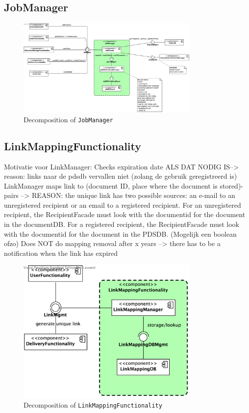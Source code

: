\documentclass[a4paper,10pt]{article}
\begin{document}
\subsection{JobManager}\label{subsec:decomp-JobManager}
\begin{figure}[!htp]
	\centering
	\includegraphics[width=0.8\textwidth]{JobManager.png}
	\caption{Decomposition of \texttt{JobManager}}
	\label{fig:decomp-JobManager}
\end{figure}
\FloatBarrier

\subsection{LinkMappingFunctionality}\label{subsec:decomp-LinkMappingFunctionality}
Motivatie voor LinkManager: Checks expiration date ALS DAT NODIG IS--> reason: links naar de pdsdb vervallen niet (zolang de gebruik geregistreerd is)
LinkManager maps link to (document ID, place where the document is stored)-pairs --> REASON: the unique link has two possible sources: an e-mail to an unregistered recipient or an email to a registered recipient. For an unregistered recipient, the RecipientFacade must look with the documentid for the document in the documentDB. For a registered recipient, the RecipientFacade must look with the documentid for the document  in the PDSDB. (Mogelijk een boolean ofzo)
Does NOT do mapping removal after x years --> there has to be a notification when the link has expired
\begin{figure}[!htp]
	\centering
	\includegraphics[width=0.8\textwidth]{LinkMappingFunctionality.png}
	\caption{Decomposition of \texttt{LinkMappingFunctionality}}
	\label{fig:decomp-LinkMappingFunctionality}
\end{figure}
\FloatBarrier
\end{document}
